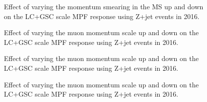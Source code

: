 \begin{figure}[!ht]
  \begin{center}
  \end{center}
  \caption[Muon MS uncertainty, LC+GSC scale with 2016 Z+jet]
  {Effect of varying the momentum smearing in the MS up and down on the LC+GSC scale MPF response using Z+jet events in 2016. }
  \label{plot:ZJetLC2016MSApp}
\end{figure}
\begin{figure}[!ht]
  \begin{center}
  \end{center}
  \caption[Muon inner detector uncertainty, LC+GSC scale with 2016 Z+jet]
  {Effect of varying the muon momentum scale up and down on the LC+GSC scale MPF response using Z+jet events in 2016.}
  \label{plot:ZJetLC2016MScaleApp}
\end{figure}

\begin{figure}[!ht]
  \begin{center}
  \end{center}
  \caption[Muon inner detector uncertainty, LC+GSC scale with 2016 Z+jet]
  {Effect of varying the muon momentum scale up and down on the LC+GSC scale MPF response using Z+jet events in 2016.}
  \label{plot:ZJetLC2016MScaleApp}
\end{figure}

\begin{figure}[!ht]
  \begin{center}
  \end{center}
  \caption[Muon inner detector uncertainty, LC+GSC scale with 2016 Z+jet]
  {Effect of varying the muon momentum scale up and down on the LC+GSC scale MPF response using Z+jet events in 2016.}
  \label{plot:ZJetLC2016MScaleApp}
\end{figure}


